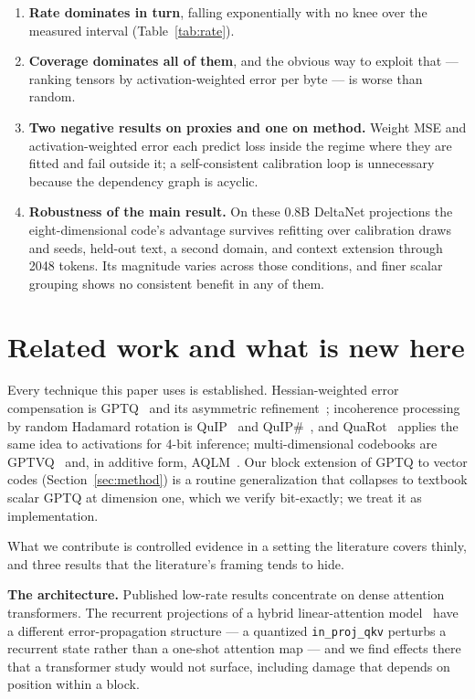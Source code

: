 \documentclass[11pt]{article}
\begin{document}
\begin{enumerate}
$68$--$69\%$ of the damage against the codec's $6$--$32\%$, and it improves loss
while degrading weight MSE.
\item \textbf{Rate dominates in turn}, falling exponentially with no knee over
the measured interval (Table~\ref{tab:rate}).
\item \textbf{Coverage dominates all of them}, and the obvious way to exploit
that --- ranking tensors by activation-weighted error per byte --- is worse than
random.
\item \textbf{Two negative results on proxies and one on method.} Weight MSE and
activation-weighted error each predict loss inside the regime where they are
fitted and fail outside it; a self-consistent calibration loop is unnecessary
because the dependency graph is acyclic.
\item \textbf{Robustness of the main result.} On these 0.8B DeltaNet
projections the eight-dimensional code's advantage survives refitting over
calibration draws and seeds, held-out text, a second domain, and context
extension through 2048 tokens. Its magnitude varies across those conditions,
and finer scalar grouping shows no consistent benefit in any of them.
\end{enumerate}

\section{Related work and what is new here}

Every technique this paper uses is established. Hessian-weighted error
compensation is GPTQ~\cite{gptq} and its asymmetric refinement~\cite{gptaq};
incoherence processing by random Hadamard rotation is QuIP~\cite{quip} and
QuIP\#~\cite{quipsharp}, and QuaRot~\cite{quarot} applies the same idea to
activations for 4-bit inference; multi-dimensional codebooks are
GPTVQ~\cite{gptvq} and, in additive form, AQLM~\cite{aqlm}. Our block extension
of GPTQ to vector codes (Section~\ref{sec:method}) is a routine generalization
that collapses to textbook scalar GPTQ at dimension one, which we verify
bit-exactly; we treat it as implementation.

What we contribute is controlled evidence in a setting the literature covers
thinly, and three results that the literature's framing tends to hide.

\textbf{The architecture.} Published low-rate results concentrate on dense
attention transformers. The recurrent projections of a hybrid linear-attention
model~\cite{deltanet} have a different error-propagation structure --- a quantized
\texttt{in\_proj\_qkv} perturbs a recurrent state rather than a one-shot
attention map --- and we find effects there that a transformer study would not
surface, including damage that depends on position within a block.
\end{document}
